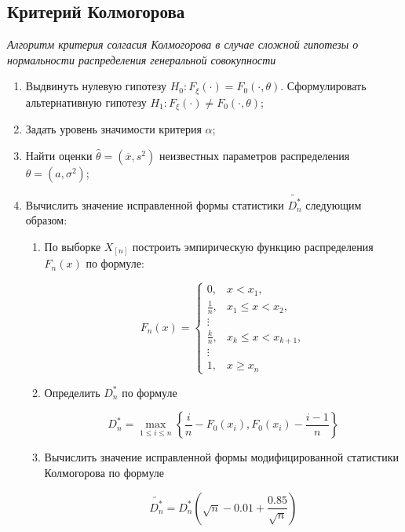 \subsection{Критерий Колмогорова}

\textit{Алгоритм критерия солгасия Колмогорова в случае сложной гипотезы о нормальности распределения генеральной совокупности}

\begin{enumerate}
	\item Выдвинуть нулевую гипотезу $H_0: F_{\xi}(\cdot) = F_0(\cdot, \theta)$. Сформулировать альтернативную гипотезу $H_1: F_{\xi}(\cdot) \ne F_0(\cdot, \theta)$;
	\item Задать уровень значимости критерия $\alpha$;
	\item Найти оценки $\hat{\theta} = (\overline{x}, s^2)$ неизвестных параметров распределения $\theta = (a, \sigma^2)$;
	\item Вычислить значение исправленной формы статистики $\tilde{D^*_n}$ следующим образом:
	\begin{enumerate}
		\item По выборке $X_{[n]}$ построить эмпирическую функцию распределения $F_n(x)$ по формуле:
		
		\begin{equation}\label{ecdf}
			F_n(x) = \left\{
			\begin{matrix}
				0, & x < x_1, \\
				\frac{1}{n}, & x_1 \leq x < x_2, \\
				\vdots & \\
				\frac{k}{n}, & x_k \leq x < x_{k+1}, \\
				\vdots & \\
				1, & x \geq x_n
			\end{matrix}
			\right.
		\end{equation}
		
		\item Определить $D^*_n$ по формуле 
		
		\begin{equation}
			D^*_n = \max_{1 \leq i \leq n} \left\{\frac{i}{n} - F_0(x_i), F_0(x_i) - \frac{i - 1}{n} \right\}
		\end{equation}
		
		\item Вычислить значение исправленной формы модифицированной статистики Колмогорова по формуле
		
		\begin{equation}
			\tilde{D^*_n} = D^*_n \left(\sqrt{n} - 0.01 + \frac{0.85}{\sqrt{n}} \right)
		\end{equation}
		

\end{enumerate}
\end{enumerate}
